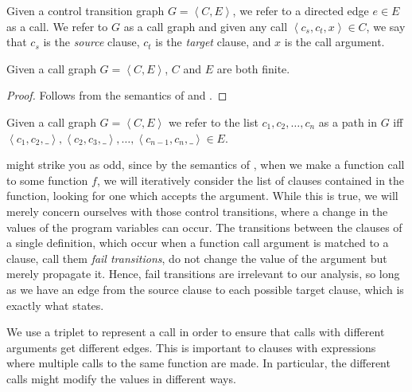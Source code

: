 \begin{definition} Given a control transition graph $G= \left\langle C,E
\right\rangle$, we refer to a directed edge $e\in E$ as a call. We refer to $G$
as a call graph and given any call $\left\langle c_s,c_t,x \right\rangle \in
C$, we say that $c_s$ is the \emph{source} clause, $c_t$ is the \emph{target}
clause, and $x$ is the call argument.  \end{definition}

\begin{lemma}\label{lemma:first-call-graph-finite} Given a call graph $G=
\left\langle C,E \right\rangle$, $C$ and $E$ are both finite.\end{lemma}

\begin{proof} Follows from the semantics of \D{} and
.\end{proof}

\begin{definition} Given a call graph $G = \left\langle C,E \right\rangle$ we
refer to the list $c_1,c_2,\ldots,c_n$ as a path in $G$ iff\\ $\left\langle
c_1,c_2,\_ \right\rangle, \left\langle c_2,c_3,\_ \right\rangle,
\ldots,\left\langle c_{n-1}, c_n,\_ \right\rangle \in E$.\end{definition}

 might strike you as odd, since by
the semantics of \D{}, when we make a function call to some function $f$, we
will iteratively consider the list of clauses contained in the function,
looking for one which accepts the argument. While this is true, we will merely
concern ourselves with those control transitions, where a change in the values
of the program variables can occur. The transitions between the clauses of a
single definition, which occur when a function call argument is matched to a
clause, call them \emph{fail transitions}, do not change the value of the
argument but merely propagate it.  Hence, fail transitions are irrelevant to
our analysis, so long as we have an edge from the source clause to each
possible target clause, which is exactly what
 states.

We use a triplet to represent a call in order to ensure that calls with
different arguments get different edges. This is important to clauses with
expressions where multiple calls to the same function are made. In particular,
the different calls might modify the values in different ways.

